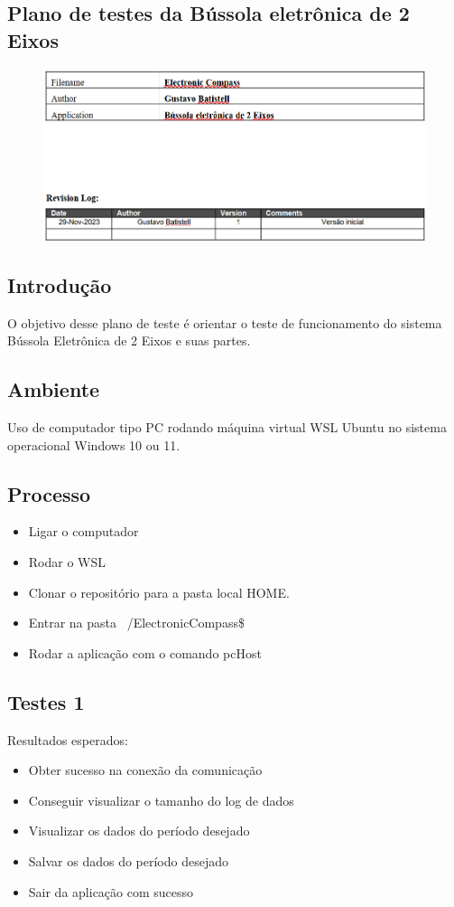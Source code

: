 \documentclass[10pt,twocolumn,letterpaper]{article}
\begin{document}
\subsection*{Plano de testes da Bússola eletrônica de 2 Eixos}
\begin{figure}[h]
  \centering
  \includegraphics[keepaspectratio=true,scale=0.44]{figures/PlanoTestes.png}
  \label{fig:diagrama-classes}
\end{figure}

\subsection*{Introdução}
O objetivo desse plano de teste é orientar o teste de funcionamento do sistema Bússola Eletrônica	de 2 Eixos e suas partes.
\subsection*{Ambiente}
Uso de computador tipo PC rodando máquina virtual WSL Ubuntu no sistema operacional Windows 10 ou 11.
\subsection*{Processo}
\begin{itemize}
  \item Ligar o computador
  \item Rodar o WSL
  \item Clonar o repositório \cite{src-github} para a pasta local HOME.
  \item Entrar na pasta ~/ElectronicCompass\$ 
  \item Rodar a aplicação com o comando pcHost
\end{itemize}

\subsection*{Testes 1}
Resultados esperados:
\begin{itemize}
  \item Obter sucesso na conexão da comunicação
  \item Conseguir visualizar o tamanho do log de dados
  \item Visualizar os dados do período desejado
  \item Salvar os dados do período desejado
  \item Sair da aplicação com sucesso
\end{itemize}
\end{document}
